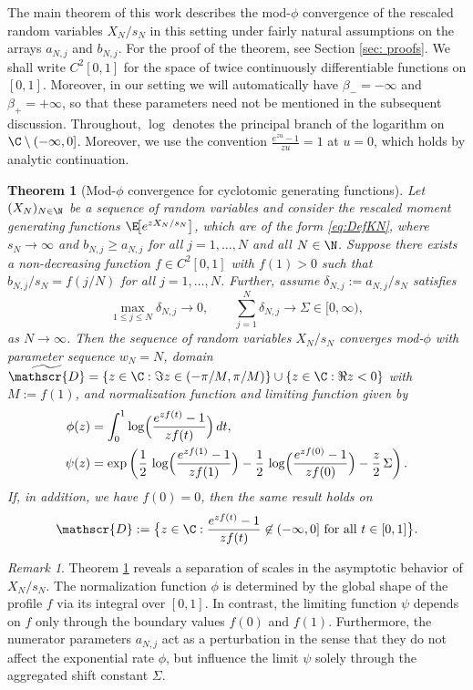 \documentclass[11pt,a4paper]{scrartcl}
\numberwithin{equation}{section}
\theoremstyle{plain}
\newtheorem{theorem}{Theorem}[section]
\theoremstyle{definition}
\theoremstyle{remark}
\newtheorem{remark}{Remark}[section]
\begin{document}
The main theorem of this work describes the mod-$\phi$ convergence of the rescaled random variables $X_N/s_N$ in this setting under fairly natural assumptions on the arrays $a_{N,j}$ and $b_{N,j}$. For the proof of the theorem, see Section \ref{sec: proofs}. We shall write $C^2[0,1]$ for the space of twice continuously differentiable functions on $[0,1]$. Moreover, in our setting we will automatically have $\beta_{-} = -\infty$ and $\beta_{+} = +\infty$, so that these parameters need not be mentioned in the subsequent discussion. Throughout, $\log$ denotes the principal branch of the logarithm on $\C\setminus(-\infty,0]$. Moreover, we use the convention $\frac{e^{zu}-1}{zu}=1$ at $u=0$, which holds by analytic continuation.

\begin{theorem}[Mod-$\phi$ convergence for cyclotomic generating functions]\label{thm:modphi-mixed}
	Let $(X_N)_{N\in\N}$ be a sequence of random variables and consider the rescaled moment generating functions $\E\!\big[e^{zX_N/s_N}\big]$, which are of the form \eqref{eq:DefKN},
 where $s_N\to\infty$ and $b_{N,j} \ge a_{N,j}$ for all $j=1, \ldots, N$ and all $N\in\N$.  Suppose there exists a 
	non-decreasing function $f\in C^{2}[0,1]$ with $f(1)>0$ such that $b_{N,j}/s_N=f(j/N)$ for all $j=1,\ldots,N$.  Further, assume  $\delta_{N,j}:=a_{N,j}/s_N$ satisfies
	\[
	\max_{1\le j\le N} \delta_{N,j} \to 0, \qquad 
	\sum_{j=1}^{N}\delta_{N,j} \to \Sigma \in [0,\infty),
	\]
	as $N\to\infty$. Then the sequence of random variables ${X_N}/{s_N}$ converges mod-$\phi$ with parameter sequence $w_N=N$, domain $\widetilde{\mathscr{D}} = \{z\in \C: \Im z \in (-\pi/M, \pi/M)\}\cup \{z\in\C: \Re z < 0\}$ with $M := f(1)$, and normalization function and limiting function given by
	\begin{align*}
	\phi(z) &= \int_{0}^{1} \log\Bigl(\frac{e^{z f(t)}-1}{z f(t)}\Bigr)\,dt, \\
	\psi(z) &= \exp\left(
		\frac12\,\log\Bigl(\frac{e^{z f(1)}-1}{z f(1)}\Bigr)
		- \frac12\,\log\Bigl(\frac{e^{z f(0)}-1}{z f(0)}\Bigr)
		- \frac{z}{2}\,\Sigma
	\right).
	\end{align*}
If, in addition, we have $f(0) = 0$, then the same result holds on
$$
\mathscr{D} := \bigl\{z\in \C: \frac{e^{z f(t)}-1}{z f(t)}\not\in (-\infty, 0] \text{ for all } t\in [0,1]\bigr\}.
$$
\end{theorem}



\begin{remark}\label{rmk:interpretation-eta-psi}
	Theorem \ref{thm:modphi-mixed} reveals a separation of scales in the asymptotic behavior of $X_N/s_N$. The normalization function $\phi$ is determined by the global shape of the profile $f$ via its integral over $[0,1]$. In contrast, the limiting function $\psi$ depends on $f$ only through the boundary values $f(0)$ and $f(1)$. Furthermore, the numerator parameters $a_{N,j}$ act as a perturbation in the sense that they do not affect the exponential rate $\phi$, but influence the limit $\psi$ solely through the aggregated shift constant $\Sigma$.
\end{remark}
\end{document}
